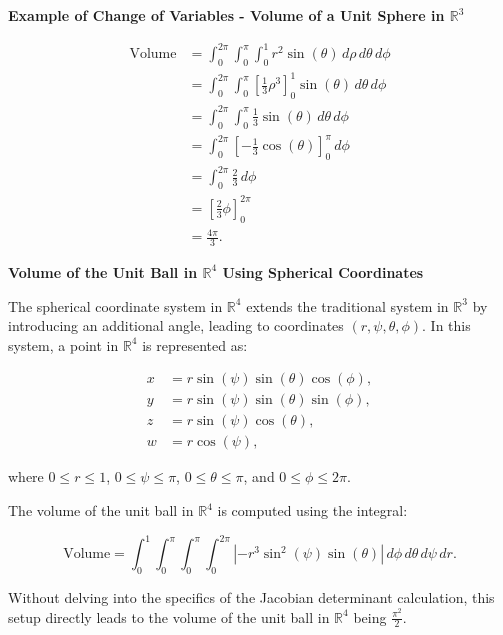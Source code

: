 \documentclass{article}
\newcommand{\R}{\mathbb{R}}
\newenvironment{definition}[1]{
    \par\noindent\textbf{#1}\par\noindent
}{
    \par \vspace{0.5cm}
}
\begin{document}
\begin{definition}{Example of Change of Variables - Volume of a Unit Sphere in \(\R^3\)}
\begin{align*}
\text{Volume} &= \int_{0}^{2\pi} \int_{0}^{\pi} \int_{0}^{1} r^2 \sin(\theta) \, d\rho \, d\theta \, d\phi \\
&= \int_{0}^{2\pi} \int_{0}^{\pi} \left[ \frac{1}{3}\rho^3 \right]_{0}^{1} \sin(\theta) \, d\theta \, d\phi \\
&= \int_{0}^{2\pi} \int_{0}^{\pi} \frac{1}{3} \sin(\theta) \, d\theta \, d\phi \\
&= \int_{0}^{2\pi} \left[ -\frac{1}{3} \cos(\theta) \right]_{0}^{\pi} \, d\phi \\
&= \int_{0}^{2\pi} \frac{2}{3} \, d\phi \\
&= \left[ \frac{2}{3} \phi \right]_{0}^{2\pi} \\
&= \frac{4\pi}{3}.
\end{align*}

\end{definition}

\begin{definition}{Volume of the Unit Ball in \(\R^4\) Using Spherical Coordinates}

The spherical coordinate system in \(\R^4\) extends the traditional system in \(\R^3\) by introducing an additional angle, leading to coordinates \((r, \psi, \theta, \phi)\). In this system, a point in \(\R^4\) is represented as:

\[
\begin{aligned}
x &= r \sin(\psi) \sin(\theta) \cos(\phi), \\
y &= r \sin(\psi) \sin(\theta) \sin(\phi), \\
z &= r \sin(\psi) \cos(\theta), \\
w &= r \cos(\psi),
\end{aligned}
\]

where \(0 \leq r \leq 1\), \(0 \leq \psi \leq \pi\), \(0 \leq \theta \leq \pi\), and \(0 \leq \phi \leq 2\pi\).

The volume of the unit ball in \(\R^4\) is computed using the integral:

\[
\text{Volume} = \int_{0}^{1} \int_{0}^{\pi} \int_{0}^{\pi} \int_{0}^{2\pi} \left| -r^3 \sin^2(\psi) \sin(\theta) \right| \, d\phi \, d\theta \, d\psi \, dr.
\]

Without delving into the specifics of the Jacobian determinant calculation, this setup directly leads to the volume of the unit ball in \(\R^4\) being \(\frac{\pi^2}{2}\).

\end{definition}
\end{document}
